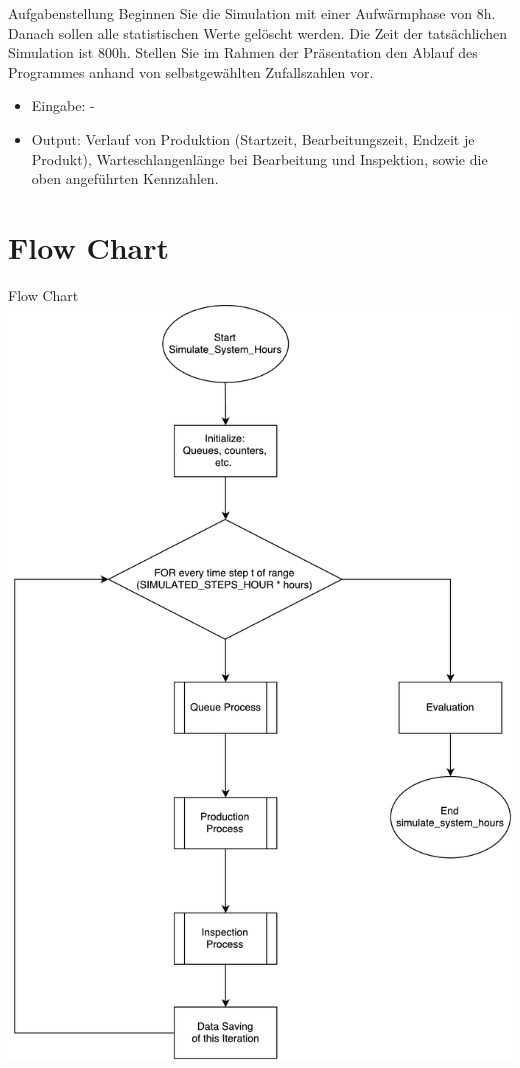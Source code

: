 \begin{frame}{Aufgabenstellung}
Beginnen Sie die Simulation mit einer Aufwärmphase von 8h. Danach sollen alle statistischen
Werte gelöscht werden. Die Zeit der tatsächlichen Simulation ist 800h. Stellen Sie
im Rahmen der Präsentation den Ablauf des Programmes anhand von selbstgewählten
Zufallszahlen vor.

\begin{itemize}
  \item Eingabe: -
  \item Output: Verlauf von Produktion (Startzeit, Bearbeitungszeit, Endzeit je Produkt),
Warteschlangenlänge bei Bearbeitung und Inspektion, sowie die oben angeführten
Kennzahlen.
\end{itemize}
\end{frame}

\section{Flow Chart}
\begin{frame}{Flow Chart}
	\centering
  	\includegraphics[scale=0.25]{BSP22_Flow_Chart.pdf}
\end{frame}

